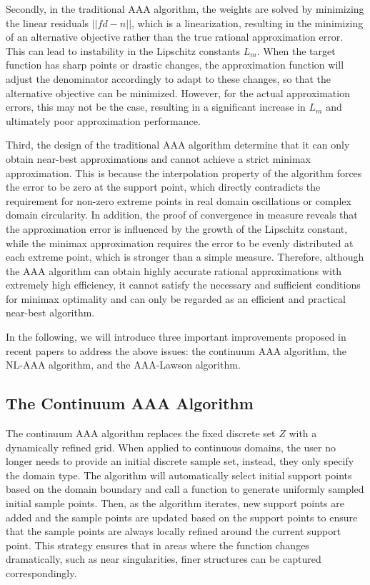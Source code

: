 \documentclass[12pt,a4paper]{article}  %
\newcounter{cite}
\theoremstyle{definition}
\numberwithin{equation}{section}
\begin{document}
Secondly, in the traditional AAA algorithm, the weights are solved by minimizing the linear residuals $||fd-n||$, which is  a linearization, resulting in the minimizing of an alternative objective rather than the true rational approximation error. This can lead to instability in the Lipschitz constants $L_m$. When the target function has sharp points or drastic changes, the approximation function will adjust the denominator accordingly to adapt to these changes, so that the alternative objective can be minimized. However, for the actual approximation errors, this may not be the case, resulting in a significant increase in $L_m$ and ultimately poor approximation performance.
 
Third, the design of the traditional AAA algorithm determine that it can only obtain near-best approximations and cannot achieve a strict minimax approximation. This is because the interpolation property of the algorithm forces the error to be zero at the support point, which directly contradicts the requirement for non-zero extreme points in real domain oscillations or complex domain circularity. In addition, the proof of convergence in measure reveals that the approximation error is influenced by the growth of the Lipschitz constant, while the minimax approximation requires the error to be evenly distributed at each extreme point, which is stronger than a simple measure. Therefore, although the AAA algorithm can obtain highly accurate rational approximations with extremely high efficiency, it cannot satisfy the necessary and sufficient conditions for minimax optimality and can only be regarded as an efficient and practical near-best algorithm.

In the following, we will introduce three important improvements proposed in recent papers to address the above issues: the continuum AAA algorithm\cite{driscoll2023aaarationalapproximationcontinuum}, the NL-AAA algorithm\cite{ackermann2026refinednonlinearleastsquaresmethod}, and the AAA-Lawson algorithm\cite{nakatsukasa2019algorithmrealcomplexrational}.

\subsection{The Continuum AAA Algorithm}
The continuum AAA algorithm replaces the fixed discrete set $Z$ with a dynamically refined grid. When applied to continuous domains, the user no longer needs to provide an initial discrete sample set, instead, they only specify the domain type. The algorithm will automatically select initial support points based on the domain boundary and call a function to generate uniformly sampled initial sample points. Then, as the algorithm iterates, new support points are added and the sample points are updated based on the support points to ensure that the sample points are always locally refined around the current support point. This strategy ensures that in areas where the function changes dramatically, such as near singularities, finer structures can be captured correspondingly.
\end{document}
